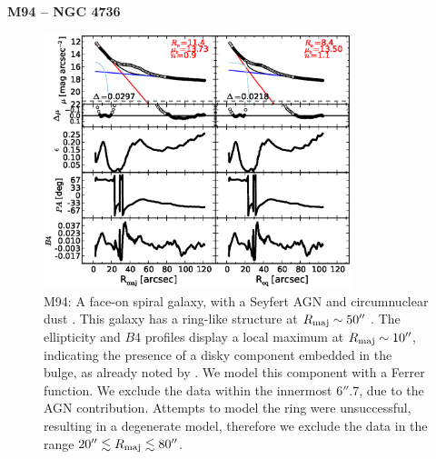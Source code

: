 \documentclass[preprint2]{emulateapj}
\newcommand{\fitfigurewidth}{0.8\textwidth}
\begin{document}
  \clearpage\newpage\noindent
  {\bf M94 -- NGC 4736 \\}

  \begin{figure}[h]
  \begin{center}
  \includegraphics[width=\fitfigurewidth]{images/m94_1Dfit.eps}
  \caption{M94: 
  A face-on spiral galaxy, with a Seyfert AGN \citep{veroncettyveron2006} and 
  circumnuclear dust \citep{elmegreen2002m94,peeplesmartini2006m94}.
  This galaxy has a ring-like structure at $R_{\rm maj} \sim 50''$ \citep{munoztunon1989m94}.
  The ellipticity and $B4$ profiles display a local maximum at $R_{\rm maj} \sim 10''$, 
  indicating the presence of a disky component embedded in the bulge,
  as already noted by \cite{fisherdrory2010}.
  We model this component with a Ferrer function.
  We exclude the data within the innermost $6''.7$, due to the AGN contribution.
  Attempts to model the ring were unsuccessful, resulting in a degenerate model, 
  therefore we exclude the data in the range $20'' \lesssim R_{\rm maj} \lesssim 80''$.
  }
  \end{center}
  \end{figure}
\end{document}

